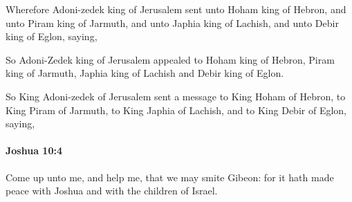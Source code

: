 			\begin{versebox}
					\item[BHS] 
					\item[ASV] Wherefore Adoni-zedek king of Jerusalem sent unto Hoham king of Hebron, and unto Piram king of Jarmuth, and unto Japhia king of Lachish, and unto Debir king of Eglon, saying,
					\item[NIV] So Adoni-Zedek king of Jerusalem appealed to Hoham king of Hebron, Piram king of Jarmuth, Japhia king of Lachish and Debir king of Eglon.
					\item[NRSV] So King Adoni-zedek of Jerusalem sent a message to King Hoham of Hebron, to King Piram of Jarmuth, to King Japhia of Lachish, and to King Debir of Eglon, saying,
			\end{versebox}

		\paragraph{Joshua 10:4} %
			\label{JOSHUA-10-4}

			Come up unto me, and help me, that we may smite Gibeon: for it hath made peace with Joshua and with the children of Israel.

